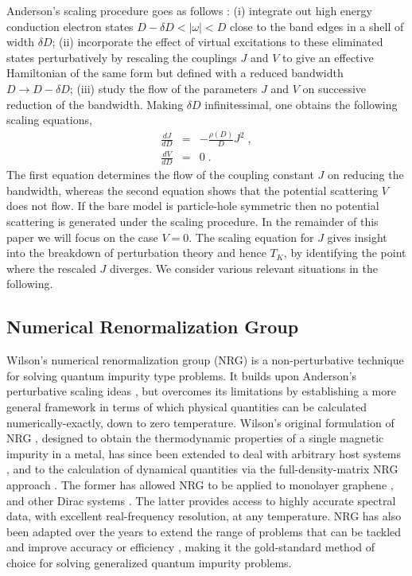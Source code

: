 Anderson's scaling procedure goes as follows \cite{anderson1970poor}: (i) integrate out high energy conduction electron states $D-\delta D<|\omega|<D$ close to the band edges in a shell of width $\delta D$; (ii) incorporate the effect of virtual excitations to these eliminated states perturbatively by rescaling the couplings $J$ and $V$ to give an effective Hamiltonian of the same form but defined with a reduced bandwidth $D\to D-\delta D$; (iii) study the flow of the parameters $J$ and $V$ on successive reduction of the bandwidth. Making $\delta D$ infinitessimal, one obtains the following scaling equations,
\begin{eqnarray}\label{eq:poorman}
	\frac{dJ}{d D}&=&-\frac{\rho(D)}{D}J^2 \;, \nonumber \\ 
	\frac{dV}{d D}&=&0\;.
\end{eqnarray}
The first equation determines the flow of the coupling constant $J$ on reducing the bandwidth, whereas the second equation shows that the potential scattering $V$ does not flow. If the bare model is particle-hole symmetric then no potential scattering is generated under the scaling procedure. In the remainder of this paper we will focus on the case $V=0$. The scaling equation for $J$ gives insight into the breakdown of perturbation theory and hence $T_K$, by identifying the point where the rescaled $J$ diverges. We consider various relevant situations in the following. 


\subsection{Numerical Renormalization Group}\label{subsec:nrg}

Wilson's numerical renormalization group \cite{wilson1975renormalization,bulla2008numerical} (NRG) is a non-perturbative technique for solving quantum impurity type problems. It builds upon Anderson's perturbative scaling ideas \cite{anderson1970poor}, but overcomes its limitations by establishing a more general framework in terms of which physical quantities can be calculated numerically-exactly, down to zero temperature. Wilson's original formulation of NRG \cite{wilson1975renormalization}, designed to obtain the thermodynamic properties of a single magnetic impurity in a metal, has since been extended to deal with arbitrary host systems \cite{chen1995kondo,bulla1997anderson,bulla2008numerical}, and to the calculation of dynamical quantities via the full-density-matrix NRG approach \cite{anders2006spin,weichselbaum2007sum}. The former has allowed NRG to be applied to monolayer graphene \cite{vojta2010gate}, and other Dirac systems \cite{mitchell2013TI, mitchell2015kondo}. The latter provides access to highly accurate spectral data, with excellent real-frequency resolution, at any temperature. NRG has also been adapted over the years to extend the range of problems that can be tackled and improve accuracy or efficiency \cite{bulla1998numerical,oliveira1994generalized,bulla2003numerical,pruschke2009energy,mitchell2014generalized,stadler2016interleaved,lee2021computing,rigo2022automatic}, making it the gold-standard method of choice for solving generalized quantum impurity problems.

